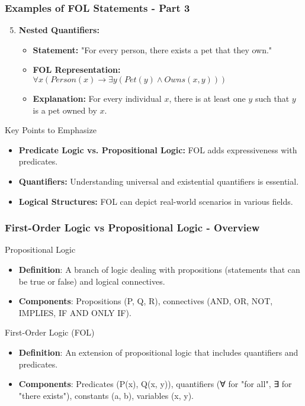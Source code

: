 \documentclass[aspectratio=169]{beamer}
\begin{document}
\begin{frame}[fragile]
    \frametitle{Examples of FOL Statements - Part 3}
    \begin{enumerate}
        \setcounter{enumi}{4} %

        \item \textbf{Nested Quantifiers:}
        \begin{itemize}
            \item \textbf{Statement:} "For every person, there exists a pet that they own."
            \item \textbf{FOL Representation:} $\forall x (Person(x) \rightarrow \exists y (Pet(y) \land Owns(x, y)))$
            \item \textbf{Explanation:} For every individual $x$, there is at least one $y$ such that $y$ is a pet owned by $x$.
        \end{itemize}
    \end{enumerate}

    \begin{block}{Key Points to Emphasize}
        \begin{itemize}
            \item \textbf{Predicate Logic vs. Propositional Logic:} FOL adds expressiveness with predicates.
            \item \textbf{Quantifiers:} Understanding universal and existential quantifiers is essential.
            \item \textbf{Logical Structures:} FOL can depict real-world scenarios in various fields.
        \end{itemize}
    \end{block}
\end{frame}

\begin{frame}[fragile]
    \frametitle{First-Order Logic vs Propositional Logic - Overview}
    
    \begin{block}{Propositional Logic}
        \begin{itemize}
            \item \textbf{Definition}: A branch of logic dealing with propositions (statements that can be true or false) and logical connectives.
            \item \textbf{Components}: Propositions (P, Q, R), connectives (AND, OR, NOT, IMPLIES, IF AND ONLY IF).
        \end{itemize}
    \end{block}
    
    \begin{block}{First-Order Logic (FOL)}
        \begin{itemize}
            \item \textbf{Definition}: An extension of propositional logic that includes quantifiers and predicates.
            \item \textbf{Components}: Predicates (P(x), Q(x, y)), quantifiers (∀ for "for all", ∃ for "there exists"), constants (a, b), variables (x, y).
        \end{itemize}
    \end{block}
\end{frame}
\end{document}
